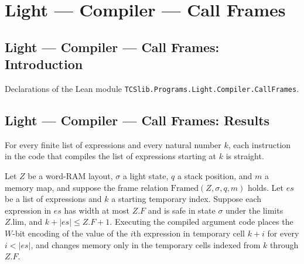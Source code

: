 \section{Light --- Compiler --- Call Frames}
\subsection*{Light --- Compiler --- Call Frames: Introduction}

Declarations of the Lean module \texttt{TCSlib.Programs.Light.Compiler.CallFrames}.

\subsection*{Light --- Compiler --- Call Frames: Results}

\begin{theorem}
\label{Light.Compiler.straight_argsCode}
\leanok
{}
For every finite list of expressions and every natural number $k$, each instruction in
the code that compiles the list of expressions starting at $k$ is straight.
\end{theorem}

\begin{theorem}
\label{Light.Compiler.effects_argsCode}
\leanok
{}
Let $Z$ be a word-RAM layout, $\sigma$ a light state, $q$ a stack position, and $m$ a
memory map, and suppose the frame relation $\mathrm{Framed}(Z,\sigma,q,m)$ holds. Let
$es$ be a list of expressions and $k$ a starting temporary index. Suppose each expression
in $es$ has width at most $Z.F$ and is safe in state $\sigma$ under the limits $Z.\mathrm{lim}$,
and $k+|es|\le Z.F+1$. Executing the compiled argument code places the $W$-bit encoding
of the value of the $i$th expression in temporary cell $k+i$ for every $i<|es|$, and
changes memory only in the temporary cells indexed from $k$ through $Z.F$.
\end{theorem}


